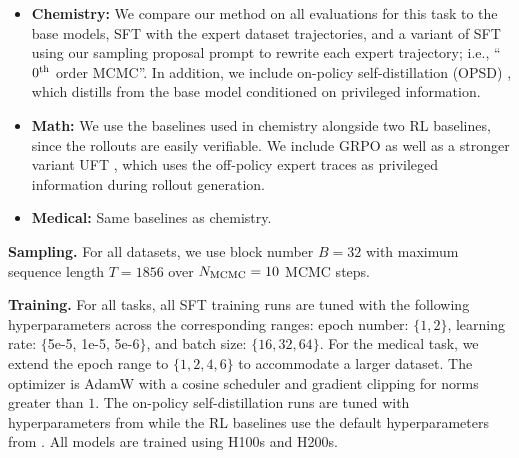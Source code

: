 \documentclass{article}
\renewcommand{\paragraph}[1]{\vspace{.1em}\noindent\textbf{#1}}
\begin{document}
\begin{itemize}[leftmargin=*]
    
    \item \textbf{Chemistry:} 
    We compare our method on all evaluations for this task to the base models, SFT with the expert dataset trajectories, and a variant of SFT using our sampling proposal prompt to rewrite each expert trajectory; i.e., ``$0^{\text{\rm th}}$ order MCMC''. In addition, we include on-policy self-distillation (OPSD) \citep{shenfeld2026self, zhao2026selfdistilledreasoner}, which distills from the base model conditioned on privileged information.  


    \item \textbf{Math:} We use the baselines used in chemistry alongside two RL baselines, since the rollouts are easily verifiable. We include GRPO \citep{shao2024deepseekmath} as well as a stronger variant UFT \citep{liu2025uft}, which uses the off-policy expert traces as privileged information during rollout generation. 

    

    \item \textbf{Medical:} Same baselines as chemistry. 


   
\end{itemize}





\paragraph{Sampling.} For all datasets, we use block number $B = 32$ with maximum sequence length $T = 1856$ over $N_{\text{\rm MCMC}} = 10$ MCMC steps.

\paragraph{Training.} For all tasks, all SFT training runs are tuned with the following hyperparameters across the corresponding ranges: epoch number: $\{1, 2\}$, learning rate: $\{$5e-5, 1e-5, 5e-6$\}$, and batch size: $\{16, 32, 64\}$. For the medical task, we extend the epoch range to $\{1, 2, 4, 6\}$ to accommodate a larger dataset. The optimizer is AdamW with a cosine scheduler and gradient clipping for norms greater than $1$. The on-policy self-distillation runs are tuned with hyperparameters from \citep{shenfeld2026self} while the RL baselines use the default hyperparameters from \citep{liu2025uft}. All models are trained using H100s and H200s. 
\end{document}

